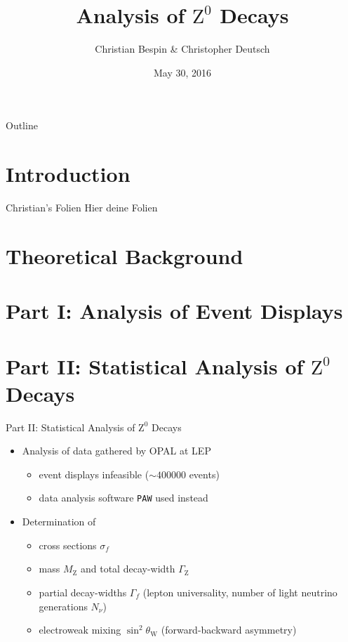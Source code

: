 \documentclass[11pt,xcolor=dvipsnames,professionalfonts]{beamer}
\author[Christian Bespin \& Christopher Deutsch]
{Christian Bespin \& Christopher Deutsch}
\title
{Analysis of $\mathrm{Z}^0$ Decays}
\subtitle
{}
\institute[]
{Advanced Laboratory Course\\ Summer Term 16}
\date{May 30, 2016}
\begin{document}
\maketitle


\begin{frame}{Outline}
	\tableofcontents
\end{frame}

\section{Introduction}
\begin{frame}{Christian's Folien}
	Hier deine Folien
\end{frame}

\section{Theoretical Background}

\section{Part I: Analysis of Event Displays}

\section{Part II: Statistical Analysis of $\mathrm{Z}^0$ Decays}
\begin{frame}{Part II: Statistical Analysis of $\mathrm{Z}^0$ Decays}
	\begin{itemize}
		\setlength\itemsep{2.em}
		\item Analysis of data gathered by OPAL at LEP
		\begin{itemize}
			\setlength\itemsep{0.5em}
			\item event displays infeasible ($\sim \num{400000}$ events)
			\item data analysis software \texttt{PAW} used instead
		\end{itemize}
		
		\item Determination of
		\begin{itemize}
			\setlength\itemsep{0.5em}
			\item cross sections $\sigma_f$
			
			\item mass $M_\mathrm{Z}$ and total decay-width $\Gamma_\mathrm{Z}$
			
			\item partial decay-widths $\Gamma_f$ (lepton universality, number of light neutrino generations $N_\nu$)
			
			\item electroweak mixing $\sin^2\theta_\mathrm{W}$ (forward-backward asymmetry)
		\end{itemize}
	\end{itemize}
\end{frame}
\end{document}
